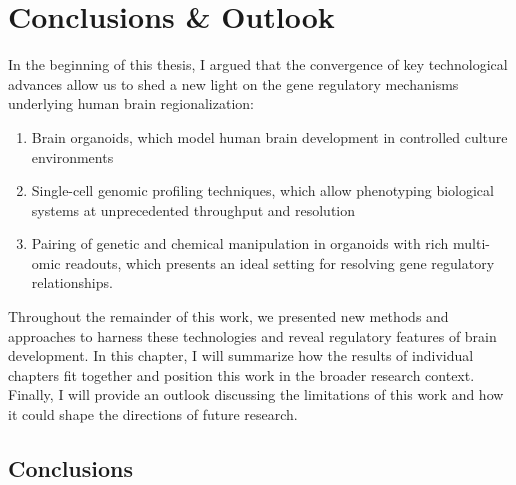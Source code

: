 \thispagestyle{plain}
\section{Conclusions \& Outlook}

In the beginning of this thesis, I argued that the convergence of key technological advances allow us to shed a new light on the gene regulatory mechanisms underlying human brain regionalization:

\begin{enumerate}
    \item Brain organoids, which model human brain development in controlled culture environments 
    \item Single-cell genomic profiling techniques, which allow phenotyping biological systems at unprecedented throughput and resolution
    \item Pairing of genetic and chemical manipulation in organoids with rich multi-omic readouts, which presents an ideal setting for resolving gene regulatory relationships.
\end{enumerate}

Throughout the remainder of this work, we presented new methods and approaches to harness these technologies and reveal regulatory features of brain development. In this chapter, I will summarize how the results of individual chapters fit together and position this work in the broader research context. Finally, I will provide an outlook discussing the limitations of this work and how it could shape the directions of future research.

\subsection{Conclusions}

